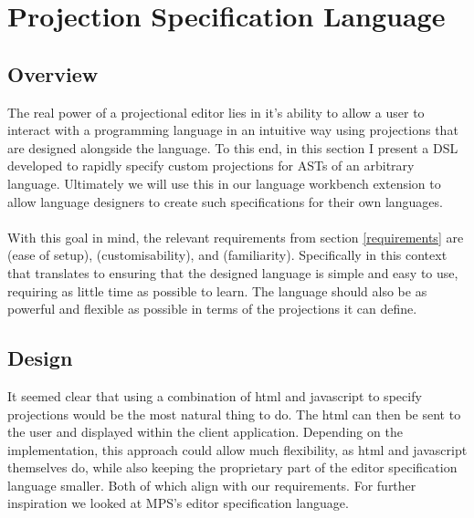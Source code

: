 \documentclass{report}
\begin{document}
\section{Projection Specification Language}\label{EditorLanguage}
\subsection{Overview}
The real power of a projectional editor lies in it's ability to allow a user to interact with a programming language in an intuitive way using projections that are designed alongside the language. To this end, in this section I present a DSL developed to rapidly specify custom projections for ASTs of an arbitrary language. Ultimately we will use this in our language workbench extension to allow language designers to create such specifications for their own languages.
\\
\\
With this goal in mind, the relevant requirements from section \ref{requirements} are \RSetup (ease of setup), \RCustom (customisability), and \RFamiliarity (familiarity). Specifically in this context that translates to ensuring that the designed language is simple and easy to use, requiring as little time as possible to learn. The language should also be as powerful and flexible as possible in terms of the projections it can define.

\subsection{Design}

It seemed clear that using a combination of html and javascript to specify projections would be the most natural thing to do. The html can then be sent to the user and displayed within the client application. Depending on the implementation, this approach could allow much flexibility, as html and javascript themselves do, while also keeping the proprietary part of the editor specification language smaller. Both of which align with our requirements. For further inspiration we looked at MPS's editor specification language.
\end{document}
